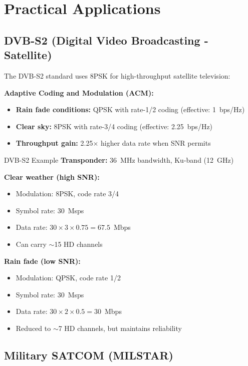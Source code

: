 \section{Practical Applications}

\subsection{DVB-S2 (Digital Video Broadcasting - Satellite)}

The DVB-S2 standard uses 8PSK for high-throughput satellite television:

\textbf{Adaptive Coding and Modulation (ACM):}
\begin{itemize}
\item \textbf{Rain fade conditions:} QPSK with rate-1/2 coding (effective: 1~bps/Hz)
\item \textbf{Clear sky:} 8PSK with rate-3/4 coding (effective: 2.25~bps/Hz)
\item \textbf{Throughput gain:} 2.25$\times$ higher data rate when SNR permits
\end{itemize}

\begin{calloutbox}{DVB-S2 Example}
\textbf{Transponder:} 36~MHz bandwidth, Ku-band (12~GHz)

\textbf{Clear weather (high SNR):}
\begin{itemize}
\item Modulation: 8PSK, code rate 3/4
\item Symbol rate: 30~Msps
\item Data rate: $30 \times 3 \times 0.75 = 67.5$~Mbps
\item Can carry $\sim$15 HD channels
\end{itemize}

\textbf{Rain fade (low SNR):}
\begin{itemize}
\item Modulation: QPSK, code rate 1/2
\item Symbol rate: 30~Msps
\item Data rate: $30 \times 2 \times 0.5 = 30$~Mbps
\item Reduced to $\sim$7 HD channels, but maintains reliability
\end{itemize}
\end{calloutbox}

\subsection{Military SATCOM (MILSTAR)}


